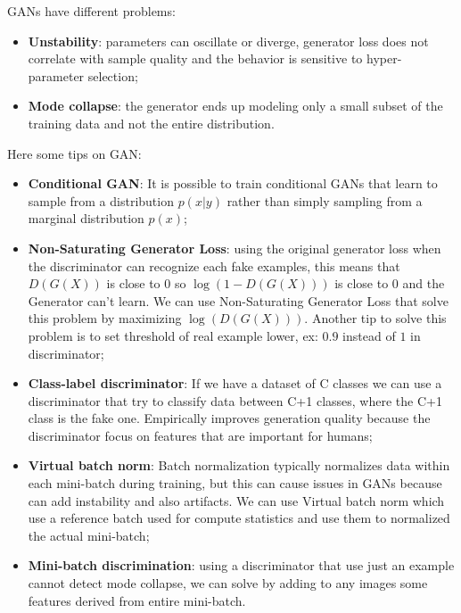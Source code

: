GANs have different problems:
\begin{itemize}
    \item \textbf{Unstability}: parameters can oscillate or diverge, generator
          loss does not correlate with sample quality and the behavior is sensitive to
          hyper-parameter selection;
    \item \textbf{Mode collapse}: the generator ends up modeling only a small
          subset of the training data and not the entire distribution.
\end{itemize}

Here some tips on GAN:
\begin{itemize}
    \item \textbf{Conditional GAN}: It is possible to train conditional GANs that learn
          to sample from a distribution $p(x | y)$ rather than simply sampling from a
          marginal distribution $p(x)$;
    \item \textbf{Non-Saturating Generator Loss}: using the original generator loss
          when the discriminator can recognize each fake examples, this means that
          $D(G(X))$ is close to $0$ so $\log(1-D(G(X)))$ is close to 0 and the Generator
          can't learn. We can use Non-Saturating Generator Loss that solve this problem
          by maximizing $\log(D(G(X)))$. Another tip to solve this problem is to set
          threshold of real example lower, ex: $0.9$ instead of $1$ in discriminator;
    \item \textbf{Class-label discriminator}: If we have a dataset of C classes
          we can use a discriminator that try to classify data between C+1 classes, where
          the C+1 class is the fake one. Empirically improves generation quality because
          the discriminator focus on features that are important for humans;
    \item \textbf{Virtual batch norm}: Batch normalization typically normalizes
          data within each mini-batch during training, but this can cause issues in GANs
          because can add instability and also artifacts. We can use Virtual batch norm
          which use a reference batch used for compute statistics and use them to normalized
          the actual mini-batch;
    \item \textbf{Mini-batch discrimination}: using a discriminator that use just
          an example cannot detect mode collapse, we can solve by adding to any
          images some features derived from entire mini-batch.
\end{itemize}

